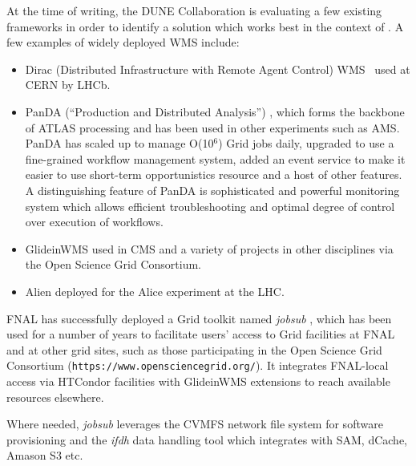 \noindent
At the time of writing, the DUNE Collaboration is evaluating a few existing frameworks in order to identify
a solution which works best in the context of \pd. A few examples of widely deployed WMS include:
\begin{itemize}

\item Dirac (Distributed Infrastructure with Remote Agent Control) WMS~\cite{dirac_wms} used at CERN by LHCb.

\item PanDA (``Production and Distributed Analysis'') \cite{panda_chep13}, which forms the backbone of ATLAS processing and has been used in other experiments such as AMS.
PanDA has scaled up to manage O(10$^6$) Grid jobs daily, upgraded to use a fine-grained workflow management system, added an event service to
make it easier to use short-term opportunistics resource and a host of other features. A distinguishing feature of PanDA is sophisticated and powerful
monitoring system which allows efficient troubleshooting and optimal degree of control over execution of workflows.

\item GlideinWMS \cite{glideinwms_chep13} used in CMS and a variety of projects in other disciplines via the Open Science Grid Consortium.

\item Alien \cite{alien} deployed for the Alice experiment at the LHC.

\end{itemize}

\noindent
FNAL has successfully deployed a Grid toolkit named \textit{jobsub} \cite{jobsub_chep13}, which has been used for a number of years to facilitate users' access to
Grid facilities at FNAL and at other grid sites, such as those participating in the Open Science Grid Consortium ({\tt https://www.opensciencegrid.org/}).
It integrates FNAL-local access via HTCondor facilities with GlideinWMS extensions to reach available resources elsewhere.

Where needed, \textit{jobsub} leverages the CVMFS network file system for software provisioning and the \textit{ifdh} data handling tool which integrates
with SAM, dCache, Amason S3 etc.
